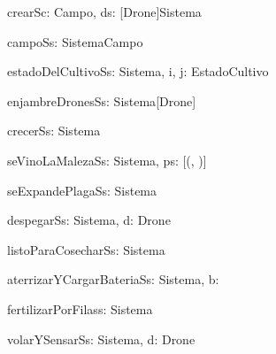 \begin{problema}{crearS}{c: Campo, ds: [Drone]}{Sistema}
\end{problema}

\begin{problema}{campoS}{s: Sistema}{Campo}
\end{problema}

\begin{problema}{estadoDelCultivoS}{s: Sistema, i, j: \ent}{EstadoCultivo}
\end{problema}

\begin{problema}{enjambreDronesS}{s: Sistema}{[Drone]}
\end{problema}

\begin{problema}{crecerS}{s: Sistema}{}
\end{problema}

\begin{problema}{seVinoLaMalezaS}{s: Sistema, ps: [(\ent, \ent)]}{}
\end{problema}

\begin{problema}{seExpandePlagaS}{s: Sistema}{}
\end{problema}

\begin{problema}{despegarS}{s: Sistema, d: Drone}{}
\end{problema}

\begin{problema}{listoParaCosecharS}{s: Sistema}{\bool}
\end{problema}

\begin{problema}{aterrizarYCargarBateriaS}{s: Sistema, b: \ent}{}
\end{problema}

\begin{problema}{fertilizarPorFilas}{s: Sistema}{}
\end{problema}

\begin{problema}{volarYSensarS}{s: Sistema, d: Drone}{}
\end{problema}
